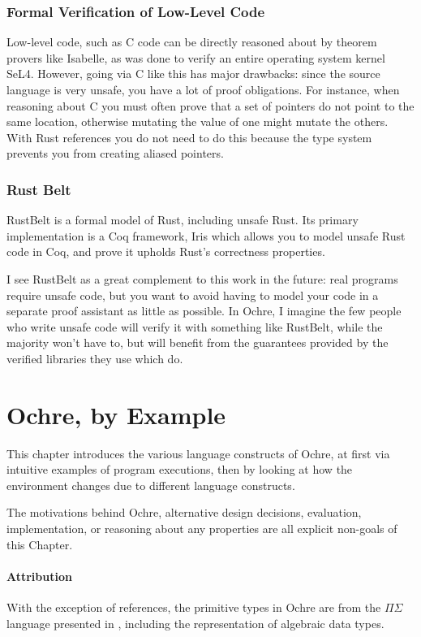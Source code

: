 \documentclass[12pt,twoside]{report}
\begin{document}
\subsection{Formal Verification of Low-Level Code}
Low-level code, such as C code can be directly reasoned about by theorem provers like Isabelle, as was done to verify an entire operating system kernel SeL4\citep{klein_sel4_2009}. However, going via C like this has major drawbacks: since the source language is very unsafe, you have a lot of proof obligations. For instance, when reasoning about C you must often prove that a set of pointers do not point to the same location, otherwise mutating the value of one might mutate the others. With Rust references you do not need to do this because the type system prevents you from creating aliased pointers.

\subsection{Rust Belt}
RustBelt\citep{jung_rustbelt_2018} is a formal model of Rust, including unsafe Rust. Its primary implementation is a Coq framework, Iris\citep{noauthor_iris_nodate} which allows you to model unsafe Rust code in Coq, and prove it upholds Rust's correctness properties.

I see RustBelt as a great complement to this work in the future: real programs require unsafe code, but you want to avoid having to model your code in a separate proof assistant as little as possible. In Ochre, I imagine the few people who write unsafe code will verify it with something like RustBelt, while the majority won't have to, but will benefit from the guarantees provided by the verified libraries they use which do.

\chapter{Ochre, by Example}
\label{section:ochreexample}
This chapter introduces the various language constructs of Ochre, at first via intuitive examples of program executions, then by looking at how the environment changes due to different language constructs.

The motivations behind Ochre, alternative design decisions, evaluation, implementation, or reasoning about any properties are all explicit non-goals of this Chapter.

\subsubsection{Attribution}
With the exception of references, the primitive types in Ochre are from the $\Pi\Sigma$ language presented in \cite{altenkirch2010pisigma}, including the representation of algebraic data types.
\end{document}
